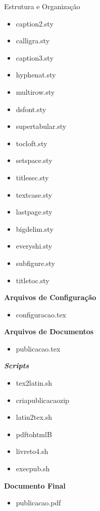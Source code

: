 \documentclass[10pt]{beamer}
\begin{document}
\begin{frame}{Estrutura e Organização}
\begin{multicols}{4}
{    	\begin{itemize}[leftmargin=0pt, itemindent=0pt,labelwidth=15pt,labelsep=0pt, listparindent=0cm,align=left]
            \item caption2.sty
            \item calligra.sty
            \item caption3.sty
    		\item hyphenat.sty
    		\item multirow.sty    
            \item dsfont.sty
    		\item supertabular.sty
    		\item tocloft.sty   
            \item setspace.sty
    		\item titlesec.sty   
            \item textcase.sty
    		\item lastpage.sty     
            \item bigdelim.sty
    		\item everyshi.sty 
            \item subfigure.sty
    		\item titletoc.sty
    	\end{itemize}
        \pause
    	\textbf{Arquivos de Configuração}
    	\begin{itemize}[leftmargin=0pt, itemindent=0pt,labelwidth=15pt,labelsep=0pt, listparindent=0cm,align=left]
    		\item configuracao.tex
    	\end{itemize}
        \pause
        \textbf{Arquivos de Documentos}
        \begin{itemize}[leftmargin=0pt, itemindent=0pt,labelwidth=15pt,labelsep=0pt, listparindent=0cm,align=left]
            \item publicacao.tex
        \end{itemize}
        \pause
        \textbf{\textit{Scripts}}
        \begin{itemize}[leftmargin=0pt, itemindent=0pt,labelwidth=15pt,labelsep=0pt, listparindent=0cm,align=left]
            \item tex2latin.sh
            \item criapublicacaozip
            \item latin2tex.sh
            \item pdftohtmlB
            \item livreto4.sh
            \item execpub.sh
        \end{itemize}
        \pause
        \textbf{Documento Final}
        \begin{itemize}[leftmargin=0pt, itemindent=0pt,labelwidth=15pt,labelsep=0pt, listparindent=0cm,align=left]
            \item publicacao.pdf
        \end{itemize}
    }
    \end{multicols}
\end{frame}
\end{document}
